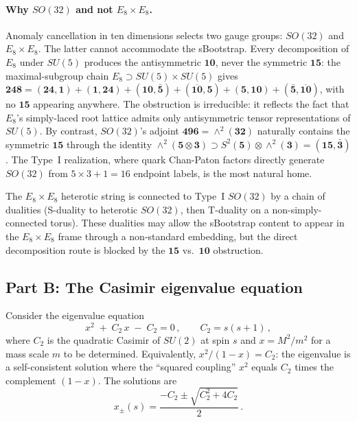 \documentclass[12pt,a4paper]{article}
\begin{document}
\paragraph{Why $SO(32)$ and not $E_8 \times E_8$.}
Anomaly cancellation in ten dimensions selects two gauge groups:
$SO(32)$ and $E_8 \times E_8$. The latter cannot accommodate the
sBootstrap. Every decomposition of $E_8$ under $SU(5)$ produces
the antisymmetric $\mathbf{10}$, never the symmetric $\mathbf{15}$:
the maximal-subgroup chain $E_8 \supset SU(5) \times SU(5)$ gives
$\mathbf{248} = (\mathbf{24},\mathbf{1}) + (\mathbf{1},\mathbf{24})
+ (\mathbf{10},\bar{\mathbf{5}}) + (\overline{\mathbf{10}},\mathbf{5})
+ (\mathbf{5},\mathbf{10}) + (\bar{\mathbf{5}},\overline{\mathbf{10}})$,
with no $\mathbf{15}$ appearing anywhere.  The obstruction is
irreducible: it reflects the fact that $E_8$'s simply-laced root
lattice admits only antisymmetric tensor representations of
$SU(5)$.  By contrast, $SO(32)$'s adjoint $\mathbf{496} =
\wedge^2(\mathbf{32})$ naturally contains the symmetric
$\mathbf{15}$ through the identity
$\wedge^2(\mathbf{5} \otimes \mathbf{3}) \supset
S^2(\mathbf{5}) \otimes \wedge^2(\mathbf{3})
= (\mathbf{15}, \bar{\mathbf{3}})$.  The Type~I realization, where
quark Chan-Paton factors directly generate $SO(32)$ from
$5\!\times\!3 + 1 = 16$ endpoint labels, is the most natural home.

The $E_8 \times E_8$ heterotic string is connected to Type~I $SO(32)$
by a chain of dualities (S-duality to heterotic $SO(32)$, then
T-duality on a non-simply-connected torus).  These dualities may
allow the sBootstrap content to appear in the $E_8 \times E_8$ frame
through a non-standard embedding, but the direct decomposition
route is blocked by the $\mathbf{15}$ vs.\ $\mathbf{10}$
obstruction.

\subsection{Part B: The Casimir eigenvalue equation}
\label{subsec:casimir_eq}

Consider the eigenvalue equation
\begin{equation}
\label{eq:casimir_quartic}
x^2 \;+\; C_2\,x \;-\; C_2 = 0\,,
\qquad C_2 = s(s+1)\,,
\end{equation}
where $C_2$ is the quadratic Casimir of $SU(2)$ at spin $s$ and
$x = M^2/m^2$ for a mass scale $m$ to be determined.  Equivalently,
$x^2/(1-x) = C_2$: the eigenvalue is a self-consistent solution
where the ``squared coupling'' $x^2$ equals $C_2$ times the
complement $(1-x)$.  The solutions are
\begin{equation}
\label{eq:casimir_roots}
x_{\pm}(s) = \frac{-C_2 \pm \sqrt{C_2^2 + 4C_2}}{2}\,.
\end{equation}
\end{document}
